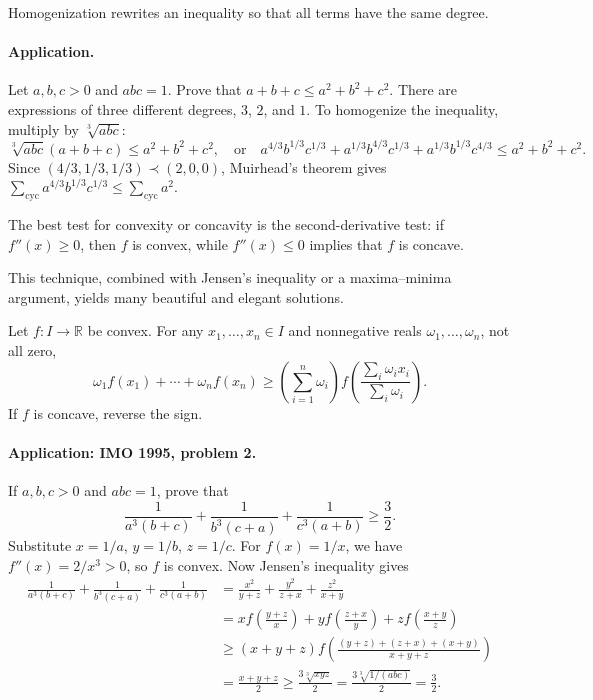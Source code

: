 \documentclass[11pt,a4paper]{article}
\begin{document}
\setcounter{theorem}{22}\begin{lemma}[Homogenization]
Homogenization rewrites an inequality so that all terms have the same degree.
\end{lemma}
\paragraph{Application.}
Let $a,b,c>0$ and $abc=1$. Prove that $a+b+c\leq a^2+b^2+c^2$.
There are expressions of three different degrees, $3$, $2$, and $1$.
To homogenize the inequality, multiply by $\sqrt[3]{abc}$:
\[
\sqrt[3]{abc}(a+b+c)\leq a^2+b^2+c^2,
\quad\text{or}\quad
a^{4/3}b^{1/3}c^{1/3}+a^{1/3}b^{4/3}c^{1/3}+a^{1/3}b^{1/3}c^{4/3}
\leq a^2+b^2+c^2.
\]
Since $(4/3,1/3,1/3)\prec(2,0,0)$, Muirhead's theorem gives
$\sum_{\mathrm{cyc}}a^{4/3}b^{1/3}c^{1/3}\leq\sum_{\mathrm{cyc}}a^2$.

\setcounter{theorem}{23}\begin{lemma}
The best test for convexity or concavity is the second-derivative test:
if $f''(x)\geq0$, then $f$ is convex, while $f''(x)\leq0$ implies that $f$ is concave.
\end{lemma}
This technique, combined with Jensen's inequality or a maxima--minima
argument, yields many beautiful and elegant solutions.

\setcounter{theorem}{24}\begin{lemma}\label{lemma:jensen-inequality}
Let $f:I\to\mathbb R$ be convex. For any $x_1,\ldots,x_n\in I$ and nonnegative reals $\omega_1,\ldots,\omega_n$, not all zero,
\[
\omega_1f(x_1)+\cdots+\omega_nf(x_n)
\geq\left(\sum_{i=1}^n\omega_i\right)
 f\left(\frac{\sum_i\omega_ix_i}{\sum_i\omega_i}\right).
\]
If $f$ is concave, reverse the sign.
\end{lemma}
\paragraph{Application: IMO 1995, problem 2.}
If $a,b,c>0$ and $abc=1$, prove that
\[
\frac1{a^3(b+c)}+\frac1{b^3(c+a)}+\frac1{c^3(a+b)}\geq\frac32.
\]
Substitute $x=1/a$, $y=1/b$, $z=1/c$. For $f(x)=1/x$, we have $f''(x)=2/x^3>0$, so $f$ is convex.
Now Jensen's inequality gives
\begin{align*}
\frac1{a^3(b+c)}+\frac1{b^3(c+a)}+\frac1{c^3(a+b)}
&=\frac{x^2}{y+z}+\frac{y^2}{z+x}+\frac{z^2}{x+y}\\
&=xf\left(\frac{y+z}{x}\right)+yf\left(\frac{z+x}{y}\right)+zf\left(\frac{x+y}{z}\right)\\
&\geq(x+y+z)f\left(\frac{(y+z)+(z+x)+(x+y)}{x+y+z}\right)\\
&=\frac{x+y+z}{2}\geq\frac{3\sqrt[3]{xyz}}2
=\frac{3\sqrt[3]{1/(abc)}}2=\frac32.
\end{align*}
\end{document}
